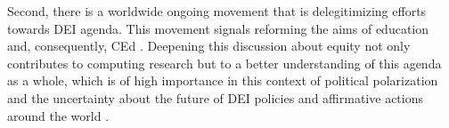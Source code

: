 Second, there is a worldwide ongoing movement that is delegitimizing efforts towards \gls{DEI} agenda. This movement signals reforming the aims of education and, consequently, \gls{CEd} \cite{tedre:2018}. Deepening this discussion about equity not only contributes to computing research but to a better understanding of this agenda as a whole, which is of high importance in this context of political polarization and the uncertainty about the future of \gls{DEI} policies and affirmative actions around the world \cite{malcom:2024}.

